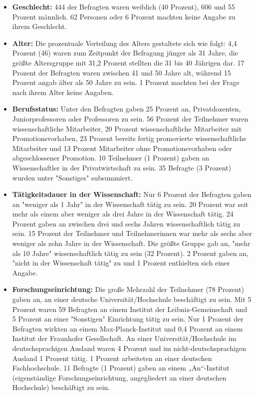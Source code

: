 \begin{itemize}
\item \textbf{Geschlecht:} 444 der Befragten waren weiblich (40 Prozent), 606 und 55 Prozent männlich. 62 Personen oder 6 Prozent machten keine Angabe zu ihrem Geschlecht.
\item \textbf{Alter:} Die prozentuale Verteilung des Alters gestaltete sich wie folgt: 4,4 Prozent (46) waren zum Zeitpunkt der Befragung jünger als 31 Jahre, die größte Altersgruppe mit 31,2 Prozent stellten die 31 bis 40 Jährigen dar. 17 Prozent der Befragten waren zwischen 41 und 50 Jahre alt, während 15 Prozent angab älter als 50 Jahre zu sein. 1 Prozent machten bei der Frage nach ihrem Alter keine Angaben.
\item \textbf{Berufsstatus:} Unter den Befragten gaben 25 Prozent an, Privatdozenten, Juniorprofessoren oder Professoren zu sein. 56 Prozent der Teilnehmer waren wissenschaftliche Mitarbeiter, 20 Prozent wissenschaftliche Mitarbeiter mit Promotionsvorhaben, 23 Prozent bereits fertig promovierte wissenschaftliche Mitarbeiter und 13 Prozent Mitarbeiter ohne Promotionsvorhaben oder abgeschlossener Promotion. 10 Teilnehmer (1 Prozent) gaben an Wissenschaftler in der Privatwirtschaft zu sein. 35 Befragte (3 Prozent) wurden unter "Sonstiges" subsummiert.
\item \textbf{Tätigkeitsdauer in der Wissenschaft:} Nur 6 Prozent der Befragten gaben an "weniger als 1 Jahr" in der Wissenschaft tätig zu sein. 20 Prozent war seit mehr als einem aber weniger als drei Jahre in der Wissenschaft tätig. 24 Prozent gaben an zwischen drei und sechs Jahren wissenschaftlich tätig zu sein. 15 Prozent der Teilnehmer und Teilnehmerinnen war mehr als sechs aber weniger als zehn Jahre in der Wissenschaft. Die größte Gruppe gab an, "mehr als 10 Jahre" wissenschaftlich tätig zu sein (32 Prozent). 2 Prozent gaben an, "nicht in der Wissenschaft tätig" zu und 1 Prozent enthielten sich einer Angabe.
\item \textbf{Forschungseinrichtung:} Die große Mehrzahl der Teilnehmer (78 Prozent) gaben an, an einer deutsche Universität/Hochschule beschäftigt zu sein. Mit 5 Prozent waren 59 Befragten an einem Institut der Leibniz-Gemeinschaft und 5 Prozent an einer "Sonstigen" Einrichtung tätig zu sein. Nur 1 Prozent der Befragten wirkten an einem Max-Planck-Institut und 0,4 Prozent an einem Institut der Fraunhofer Gesellschaft. An einer Universität/Hochschule im deutschsprachigen Ausland waren 4 Prozent und im nicht-deutschsprachigen Ausland 1 Prozent tätig. 1 Prozent arbeiteten an einer deutschen Fachhochschule. 11 Befragte (1 Prozent) gaben an einem „An“-Institut (eigenständige Forschungseinrichtung, angegliedert an einer deutschen Hochschule) beschäftigt zu sein.
\end{itemize}

